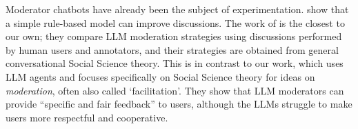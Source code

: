 Moderator chatbots have already been the subject of experimentation. \textcite{kim_et_al_chatbot} show that a simple rule-based model can improve discussions. The work of \textcite{cho-etal-2024-language} 
is the closest to our own; they compare \ac{LLM} moderation strategies using discussions performed by human users and annotators, and their strategies are obtained from general conversational Social Science theory. This is in contrast to our work, which uses \ac{LLM} agents and focuses specifically on Social Science theory for ideas on  \emph{moderation}, often also called `facilitation'. 
They show that \ac{LLM} moderators can provide “specific and fair feedback” to users, although the \acp{LLM} struggle to make users more respectful and cooperative.


